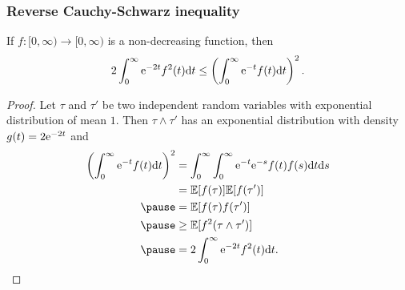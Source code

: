\documentclass[9pt,table,xcolor=dvipsnames]{beamer}%
\begin{document}
\begin{frame}[fragile,t] %
  \frametitle{Reverse Cauchy-Schwarz inequality}
  \begin{lemma} \label{L:NonDecr}
    If $f: [0,\infty)\to [0,\infty)$ is a non-decreasing function, then
    \begin{align*}
     2 \int_{0}^{\infty} {\rm e}^{-2t}f^2(t) \mathrm{d} t\leq \left( \int_0^{\infty}{\rm e}^{-t}f(t) \mathrm{d} t\right)^2.
    \end{align*}
  \end{lemma}
  \pause
  \vspace{-1em}
  \begin{proof}
    Let $\tau$ and $\tau'$ be two independent random variables with exponential distribution of mean $1$. \pause
    Then $\tau \wedge \tau'$ has an exponential distribution with density $g(t)=2 {\rm e}^{-2t}$ and \pause
    \begin{align*}
      \left(\int_0^{\infty} \e^{-t} f(t) \ud t \right)^2
      & = \int_0^{\infty}\int_0^{\infty} \e^{-t} \e^{-s}f(t) f(s)\ud t \ud s \\
      & = \E[f(\tau)]\E[f(\tau')]                                            \\ \pause
      & = \E[f(\tau) f(\tau')]                                               \\ \pause
      & \geq \E[f^2(\tau \wedge \tau')]                                      \\ \pause
      & = 2\int_0^{\infty}\e^{-2t}f^2(t) \ud t.
    \end{align*}
  \end{proof}
\end{frame}
\end{document}
